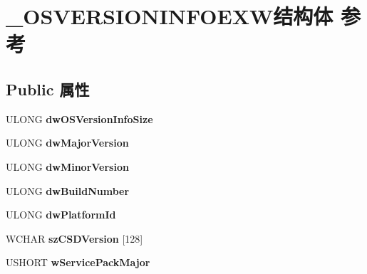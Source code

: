 \hypertarget{struct___o_s_v_e_r_s_i_o_n_i_n_f_o_e_x_w}{}\section{\+\_\+\+O\+S\+V\+E\+R\+S\+I\+O\+N\+I\+N\+F\+O\+E\+X\+W结构体 参考}
\label{struct___o_s_v_e_r_s_i_o_n_i_n_f_o_e_x_w}
\subsection*{Public 属性}
\begin{DoxyCompactItemize}
\item 
\mbox{\label{struct___o_s_v_e_r_s_i_o_n_i_n_f_o_e_x_w_a7a1ca0fc8b217e352e2f8de5e927069c}} 
U\+L\+O\+NG {\bfseries dw\+O\+S\+Version\+Info\+Size}
\item 
\mbox{\label{struct___o_s_v_e_r_s_i_o_n_i_n_f_o_e_x_w_a5bf27b1e09d60f8d9450602a44e3c33a}} 
U\+L\+O\+NG {\bfseries dw\+Major\+Version}
\item 
\mbox{\label{struct___o_s_v_e_r_s_i_o_n_i_n_f_o_e_x_w_a6778fe890f5e5db6e5aed6296a467192}} 
U\+L\+O\+NG {\bfseries dw\+Minor\+Version}
\item 
\mbox{\label{struct___o_s_v_e_r_s_i_o_n_i_n_f_o_e_x_w_ada0184b93726b683c1c6e6babd9c30d4}} 
U\+L\+O\+NG {\bfseries dw\+Build\+Number}
\item 
\mbox{\label{struct___o_s_v_e_r_s_i_o_n_i_n_f_o_e_x_w_aa30bed157d0a679d9d4113ce76c5da02}} 
U\+L\+O\+NG {\bfseries dw\+Platform\+Id}
\item 
\mbox{\label{struct___o_s_v_e_r_s_i_o_n_i_n_f_o_e_x_w_a554efaf4cc944f3b39ef5d7fb2b0b9bb}} 
W\+C\+H\+AR {\bfseries sz\+C\+S\+D\+Version} \mbox{[}128\mbox{]}
\item 
\mbox{\label{struct___o_s_v_e_r_s_i_o_n_i_n_f_o_e_x_w_adb606d25b5013a6393995d4d3c0749c4}} 
U\+S\+H\+O\+RT {\bfseries w\+Service\+Pack\+Major}

\end{DoxyCompactItemize}
